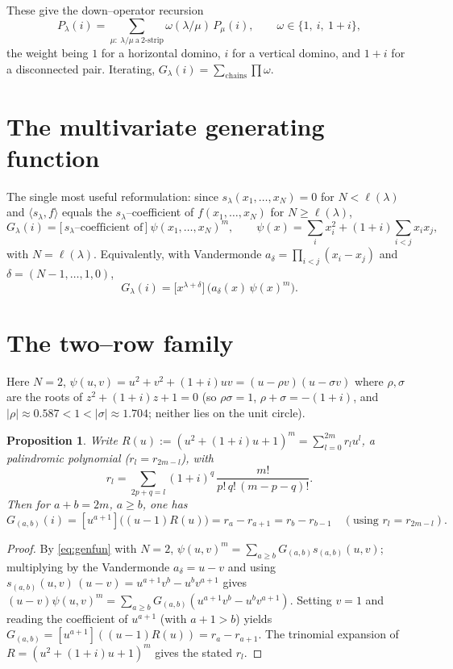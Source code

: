 \documentclass[11pt]{article}
\newtheorem{proposition}{Proposition}
\theoremstyle{definition}
\newcommand{\la}{\lambda}
\newcommand{\sll}{s_\la}
\newcommand{\inner}[2]{\langle #1,#2\rangle}
\begin{document}
\noindent These give the down--operator recursion
\begin{equation}\label{eq:rec}
P_\la(i)=\sum_{\mu:\ \la/\mu\ \mathrm{a\ 2\text{-}strip}}\omega(\la/\mu)\,P_\mu(i),
\qquad \omega\in\{1,\ i,\ 1+i\},
\end{equation}
the weight being $1$ for a horizontal domino, $i$ for a vertical domino, and
$1+i$ for a disconnected pair.  Iterating, $G_\la(i)=\sum_{\text{chains}}\prod\omega$.

\section{The multivariate generating function}
The single most useful reformulation: since $\sll(x_1,\dots,x_N)=0$ for
$N<\ell(\la)$ and $\inner{\sll}{f}$ equals the $\sll$--coefficient of $f(x_1,\dots,x_N)$
for $N\ge\ell(\la)$,
\begin{equation}\label{eq:genfun}
G_\la(i)=\bigl[\,\sll\text{--coefficient of}\,\bigr]\ \psi(x_1,\dots,x_N)^m,
\qquad \psi(x)=\sum_i x_i^2+(1+i)\!\sum_{i<j}x_ix_j,
\end{equation}
with $N=\ell(\la)$.  Equivalently, with Vandermonde
$a_\delta=\prod_{i<j}(x_i-x_j)$ and $\delta=(N-1,\dots,1,0)$,
\[
G_\la(i)=\bigl[x^{\la+\delta}\bigr]\,\bigl(a_\delta(x)\,\psi(x)^m\bigr).
\]

\section{The two--row family}
Here $N=2$, $\psi(u,v)=u^2+v^2+(1+i)uv=(u-\rho v)(u-\sigma v)$ where $\rho,\sigma$
are the roots of $z^2+(1+i)z+1=0$ (so $\rho\sigma=1$, $\rho+\sigma=-(1+i)$, and
$|\rho|\approx0.587<1<|\sigma|\approx1.704$; neither lies on the unit circle).

\begin{proposition}\label{prop:tworow}
Write $R(u):=(u^2+(1+i)u+1)^m=\sum_{l=0}^{2m}r_l u^l$, a palindromic polynomial
($r_l=r_{2m-l}$), with
\[
r_l=\sum_{2p+q=l}(1+i)^q\,\frac{m!}{p!\,q!\,(m-p-q)!}.
\]
Then for $a+b=2m$, $a\ge b$, one has
\[
G_{(a,b)}(i)=[u^{a+1}]\bigl((u-1)R(u)\bigr)=r_a-r_{a+1}
=r_b-r_{b-1}\quad(\text{using }r_l=r_{2m-l}).
\]
\end{proposition}
\begin{proof}
By \eqref{eq:genfun} with $N=2$, $\psi(u,v)^m=\sum_{a\ge b}G_{(a,b)}s_{(a,b)}(u,v)$;
multiplying by the Vandermonde $a_\delta=u-v$ and using
$s_{(a,b)}(u,v)\,(u-v)=u^{a+1}v^b-u^bv^{a+1}$ gives
$(u-v)\psi(u,v)^m=\sum_{a\ge b}G_{(a,b)}(u^{a+1}v^b-u^bv^{a+1})$.  Setting $v=1$
and reading the coefficient of $u^{a+1}$ (with $a+1>b$) yields
$G_{(a,b)}=[u^{a+1}]((u-1)R(u))=r_a-r_{a+1}$.  The trinomial expansion of
$R=(u^2+(1+i)u+1)^m$ gives the stated $r_l$.
\end{proof}
\end{document}
